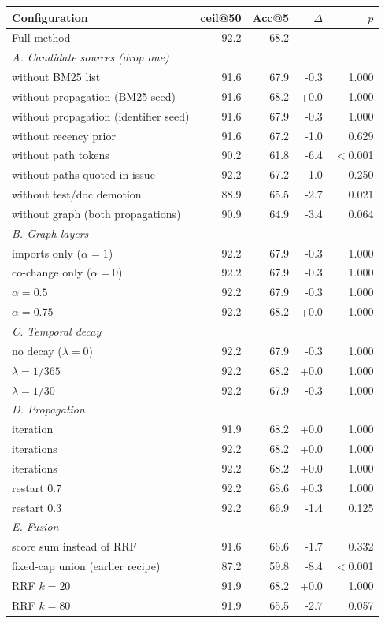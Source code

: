 \begin{tabular}{l rrr r}
\toprule
Configuration & ceil@50 & Acc@5 & $\Delta$ & $p$\\
\midrule
Full method & 92.2 & 68.2 & --- & ---\\
\midrule
\multicolumn{5}{l}{\emph{A. Candidate sources (drop one)}}\\
\quad without BM25 list & 91.6 & 67.9 & -0.3 & 1.000\\
\quad without propagation (BM25 seed) & 91.6 & 68.2 & +0.0 & 1.000\\
\quad without propagation (identifier seed) & 91.6 & 67.9 & -0.3 & 1.000\\
\quad without recency prior & 91.6 & 67.2 & -1.0 & 0.629\\
\quad without path tokens & 90.2 & 61.8 & -6.4 & $<$0.001\\
\quad without paths quoted in issue & 92.2 & 67.2 & -1.0 & 0.250\\
\quad without test/doc demotion & 88.9 & 65.5 & -2.7 & 0.021\\
\quad without graph (both propagations) & 90.9 & 64.9 & -3.4 & 0.064\\
\midrule
\multicolumn{5}{l}{\emph{B. Graph layers}}\\
\quad imports only ($\alpha{=}1$) & 92.2 & 67.9 & -0.3 & 1.000\\
\quad co-change only ($\alpha{=}0$) & 92.2 & 67.9 & -0.3 & 1.000\\
\quad $\alpha{=}0.5$ & 92.2 & 67.9 & -0.3 & 1.000\\
\quad $\alpha{=}0.75$ & 92.2 & 68.2 & +0.0 & 1.000\\
\midrule
\multicolumn{5}{l}{\emph{C. Temporal decay}}\\
\quad no decay ($\lambda{=}0$) & 92.2 & 67.9 & -0.3 & 1.000\\
\quad $\lambda{=}1/365$ & 92.2 & 68.2 & +0.0 & 1.000\\
\quad $\lambda{=}1/30$ & 92.2 & 67.9 & -0.3 & 1.000\\
\midrule
\multicolumn{5}{l}{\emph{D. Propagation}}\\
\quad 1 iteration & 91.9 & 68.2 & +0.0 & 1.000\\
\quad 2 iterations & 92.2 & 68.2 & +0.0 & 1.000\\
\quad 3 iterations & 92.2 & 68.2 & +0.0 & 1.000\\
\quad restart $0.7$ & 92.2 & 68.6 & +0.3 & 1.000\\
\quad restart $0.3$ & 92.2 & 66.9 & -1.4 & 0.125\\
\midrule
\multicolumn{5}{l}{\emph{E. Fusion}}\\
\quad score sum instead of RRF & 91.6 & 66.6 & -1.7 & 0.332\\
\quad fixed-cap union (earlier recipe) & 87.2 & 59.8 & -8.4 & $<$0.001\\
\quad RRF $k{=}20$ & 91.9 & 68.2 & +0.0 & 1.000\\
\quad RRF $k{=}80$ & 91.9 & 65.5 & -2.7 & 0.057\\
\bottomrule
\end{tabular}